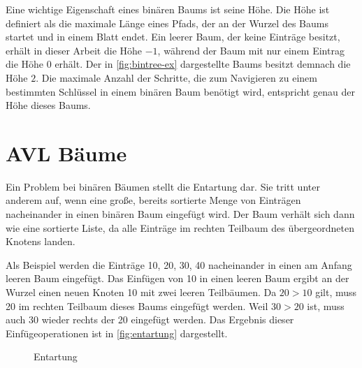 \documentclass[a4paper, parskip]{scrartcl}
\begin{document}
Eine wichtige Eigenschaft eines binären Baums ist seine Höhe. 
Die Höhe ist definiert als die maximale Länge eines Pfads, der an der Wurzel des Baums startet und in einem Blatt endet.
Ein leerer Baum, der keine Einträge besitzt, erhält in dieser Arbeit die Höhe $-1$, während der Baum mit nur einem Eintrag die Höhe $0$ erhält.
Der in \autoref{fig:bintree-ex} dargestellte Baums besitzt demnach die Höhe $2$.
Die maximale Anzahl der Schritte, die zum Navigieren zu einem bestimmten Schlüssel in einem binären Baum benötigt wird, entspricht genau der Höhe dieses Baums.

\section{AVL Bäume}
Ein Problem bei binären Bäumen stellt die Entartung dar. 
Sie tritt unter anderem auf, wenn eine große, bereits sortierte Menge von Einträgen nacheinander in einen binären Baum eingefügt wird. 
Der Baum verhält sich dann wie eine sortierte Liste, da alle Einträge im rechten Teilbaum des übergeordneten Knotens landen.

Als Beispiel werden die Einträge 10, 20, 30, 40 nacheinander in einen am Anfang leeren Baum eingefügt. 
Das Einfügen von 10 in einen leeren Baum ergibt an der Wurzel einen neuen Knoten 10 mit zwei leeren Teilbäumen. 
Da $20 > 10$ gilt, muss 20 im rechten Teilbaum dieses Baums eingefügt werden. 
Weil $30 > 20$ ist, muss auch 30 wieder rechts der 20 eingefügt werden.
Das Ergebnis dieser Einfügeoperationen ist in \autoref{fig:entartung} dargestellt.

\begin{figure}
  \caption{Entartung}
  \label{fig:entartung}
\end{figure}
\end{document}
